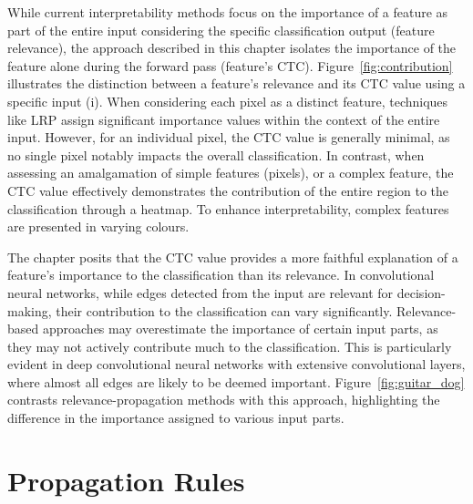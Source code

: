 While current interpretability methods focus on the importance of a feature as part of the entire input considering the specific classification output (\ie feature relevance), the approach described in this chapter isolates the importance of the feature alone during the forward pass (\ie feature's CTC). Figure~\ref{fig:contribution} illustrates the distinction between a feature's relevance and its CTC value using a specific input (i). When considering each pixel as a distinct feature, techniques like LRP assign significant importance values within the context of the entire input. However, for an individual pixel, the CTC value is generally minimal, as no single pixel notably impacts the overall classification. In contrast, when assessing an amalgamation of simple features (pixels), or a complex feature, the CTC value effectively demonstrates the contribution of the entire region to the classification through a heatmap. To enhance interpretability, complex features are presented in varying colours.



The chapter posits that the CTC value provides a more faithful explanation of a feature's importance to the classification than its relevance. In convolutional neural networks, while edges detected from the input are relevant for decision-making, their contribution to the classification can vary significantly. Relevance-based approaches may overestimate the importance of certain input parts, as they may not actively contribute much to the classification. This is particularly evident in deep convolutional neural networks with extensive convolutional layers, where almost all edges are likely to be deemed important. Figure~\ref{fig:guitar_dog} contrasts relevance-propagation methods with this approach, highlighting the difference in the importance assigned to various input parts.


\section{Propagation Rules}

